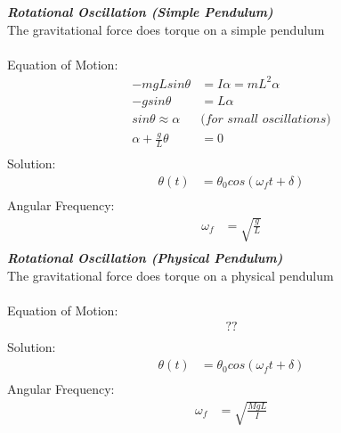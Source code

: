 \documentclass{article}
\begin{document}
\begin{enumerate}
    \textit{\textbf{Rotational Oscillation (Simple Pendulum)}} \\
    The gravitational force does torque on a simple pendulum \\
    \\
    Equation of Motion: \\
    \begin{align*}
        -mgLsin\theta&=I\alpha=mL^2\alpha \\
        -gsin\theta&=L\alpha \\
        sin\theta\approx\alpha &\textit{(for small oscillations)} \\
        \alpha+\frac{g}{L}\theta&=0 \\
    \end{align*}
    Solution: \\
    \begin{align*} 
        \theta(t)&=\theta_0cos(\omega_ft+\delta) \\
    \end{align*}
    Angular Frequency: \\
    \begin{align*} 
        \omega_f&=\sqrt{\frac{g}{L}} \\
    \end{align*}
    \textit{\textbf{Rotational Oscillation (Physical Pendulum)}} \\
    The gravitational force does torque on a physical pendulum \\
    \\
    Equation of Motion: \\
    \begin{align*}
        ?? \\
    \end{align*}
    Solution: \\
    \begin{align*} 
        \theta(t)&=\theta_0cos(\omega_ft+\delta) \\
    \end{align*}
    Angular Frequency: \\
    \begin{align*} 
        \omega_f&=\sqrt{\frac{MgL}{I}} \\
    \end{align*}
    \\
    \\
\end{enumerate}
\end{document}
